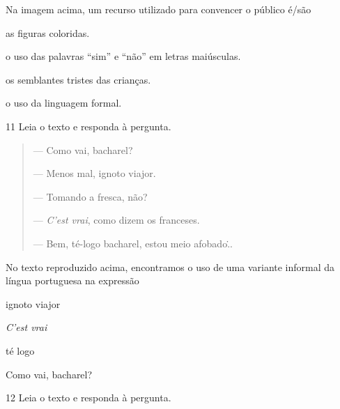 
Na imagem acima, um recurso utilizado para convencer o público é/são

\begin{escolha}
  \item as figuras coloridas.

  \item o uso das palavras ``sim'' e ``não'' em letras maiúsculas.

  \item os semblantes tristes das crianças.

  \item o uso da linguagem formal.
\end{escolha}

\pagebreak
\num{11} Leia o texto e responda à pergunta.

\begin{quote}
--- Como vai, bacharel?

--- Menos mal, ignoto viajor.

--- Tomando a fresca, não?

--- \textit{C'est vrai}, como dizem os franceses.

--- Bem, té-logo bacharel, estou meio afobado\...

\end{quote}

No texto reproduzido acima, encontramos o uso de uma variante informal
da língua portuguesa na expressão

\begin{multicols}{2}
\begin{escolha}
  \item ignoto viajor 

  \item \textit{C'est vrai}

  \item té logo

  \item Como vai, bacharel?
\end{escolha}
\end{multicols}

\num{12} Leia o texto e responda à pergunta.

